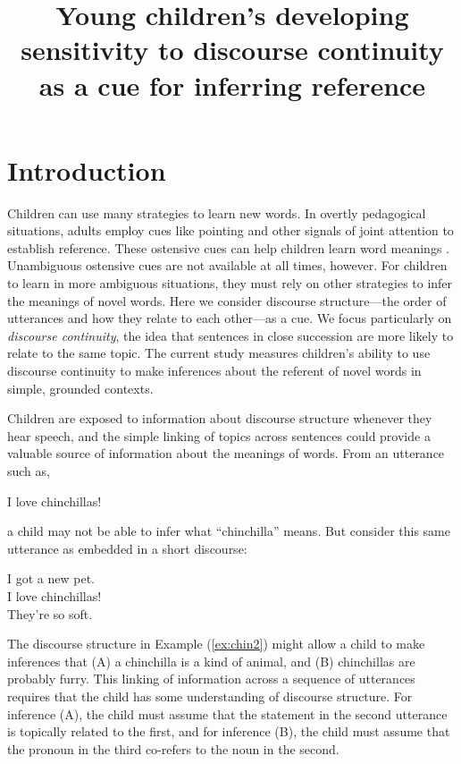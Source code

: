 \documentclass[man]{apa2}
\title{Young children's developing sensitivity to discourse continuity as a cue for inferring reference}
\begin{document}
\maketitle                            


\section{Introduction}

Children can use many strategies to learn new words.  In overtly pedagogical situations, adults employ cues like pointing and other signals of joint attention to establish reference.  These ostensive cues can help children learn word meanings \cite{bakeman1984,csibra2010,hollich2000}.  Unambiguous ostensive cues are not available at all times, however.  For children to learn in more ambiguous situations, they must rely on other strategies to infer the meanings of novel words. Here we consider discourse structure---the order of utterances and how they relate to each other---as a cue. We focus particularly on \emph{discourse continuity}, the idea that sentences in close succession are more likely to relate to the same topic. The current study measures children's ability to use discourse continuity to make inferences about the referent of novel words in simple, grounded contexts.

Children are exposed to information about discourse structure whenever they hear speech, and the simple linking of topics across sentences could provide a valuable source of information about the meanings of words. From an utterance such as,

\begin{example}
\label{ex:chin1}
I love chinchillas!
\end{example}

\noindent a child may not be able to infer what ``chinchilla'' means. But consider this same utterance as embedded in a short discourse:

\begin{example}
\label{ex:chin2}
I got a new pet. \\ I love chinchillas! \\ They're so soft.
\end{example}

\noindent The discourse structure in Example (\ref{ex:chin2}) might allow a child to make inferences that (A) a chinchilla is a kind of animal, and (B) chinchillas are probably furry.  This linking of information across a sequence of utterances requires that the child has some understanding of discourse structure.  For inference (A), the child must assume that the statement in the second utterance is topically related to the first, and for inference (B), the child must assume that the pronoun in the third co-refers to the noun in the second. 
\end{document}
